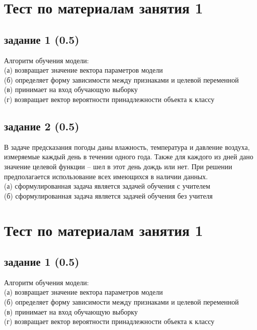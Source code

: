 \documentclass[10pt,a4paper]{article}
\author{Nikolay Anokhin}
\begin{document}
\section*{Тест по материалам занятия 1}

\subsection*{задание 1 (0.5)}

Алгоритм обучения модели: \\
(а) возвращает значение вектора параметров модели \\
(б) определяет форму зависимости между признаками и целевой переменной \\
(в) принимает на вход обучающую выборку \\
(г) возвращает вектор вероятности принадлежности объекта к классу

\subsection*{задание 2 (0.5)}

В задаче предсказания погоды даны влажность, температура и давление воздуха, измеряемые каждый день в течении одного года. Также для каждого из дней дано значение целевой функции -- шел в этот день дождь или нет. При решении предполагается использование всех имеющихся в наличии данных. \\
(а) сформулированная задача является задачей обучения с учителем \\
(б) сформулированная задача является задачей обучения без учителя

\vspace{3em}

\section*{Тест по материалам занятия 1}

\subsection*{задание 1 (0.5)}

Алгоритм обучения модели: \\
(а) возвращает значение вектора параметров модели \\
(б) определяет форму зависимости между признаками и целевой переменной \\
(в) принимает на вход обучающую выборку \\
(г) возвращает вектор вероятности принадлежности объекта к классу
\end{document}

